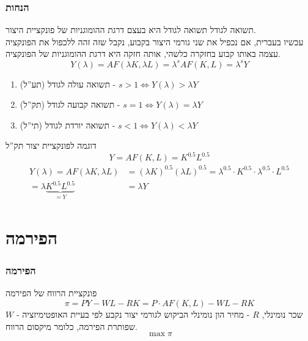 \documentclass[usenames,dvipsnames,10pt]{beamer}
\begin{document}
\begin{RTL}
\begin{frame}
    \end{frame}

    \begin{frame}[allowframebreaks]
        \frametitle{הנחות}
        \begin{block}{תשואה לגודל}
            תשואה לגודל היא בעצם דרגת ההומוגניות של פונקציית היצור. \\ 
            עכשיו בעברית, אם נכפיל את שני גורמי היצור בקבוע, נקבל שזה זהה ללכפול את הפונקציה עצמה באותו קבוע בחזקרה כלשהי, אותה חזקה היא דרגת ההומוגניות של הפונקציה.
            $$Y(\lambda) = AF(\lambda K, \lambda L) = \lambda^{s} AF(K,L) = \lambda^s Y $$
        \end{block}

        \begin{enumerate}
            \item תשואה עולה לגודל (תע''ל) - $s>1 \Longleftrightarrow  Y(\lambda) > \lambda Y $ 
            \item תשואה קבועה לגודל (תק''ל) - $s = 1 \Longleftrightarrow  Y(\lambda) = \lambda Y $
            \item תשואה יורדת לגודל (תי''ל) - $s<1 \Longleftrightarrow  Y(\lambda) < \lambda Y $
        \end{enumerate}
        
        \framebreak

        \begin{exampleblock}{דוגמה לפונקציית יצור תק''ל} 
            $$Y = AF(K,L) = K^{0.5} L^{0.5}$$
        \begin{align*}
            Y(\lambda) = AF(\lambda K , \lambda L ) &= (\lambda K )^{0.5} (\lambda L ) ^{0.5} = \lambda^{0.5} \cdot K ^{0.5} \cdot  \lambda ^{0.5} \cdot L ^{0.5} \\ =\lambda \underbrace{K^{0.5} L^{0.5}}_{=Y} &= \lambda Y
        \end{align*}
            
        \end{exampleblock}
    
    \end{frame}

    \section{הפירמה }
    \begin{frame}[allowframebreaks]
        \frametitle{הפירמה}
        \begin{block}{פונקציית הרווח של הפירמה}
            $$\pi = PY - WL - RK = P \cdot AF(K,L) - WL - RK $$
            $W$ - שכר נומינלי, $R$ - מחיר הון נומינלי
            הביקוש לגורמי יצור נקבע לפי בעיית האופטימיזציה שפותרת הפירמה, כלומר מיקסום הרווח.
            $$\max \pi$$


\end{block}
\end{frame}
\end{RTL}
\end{document}
